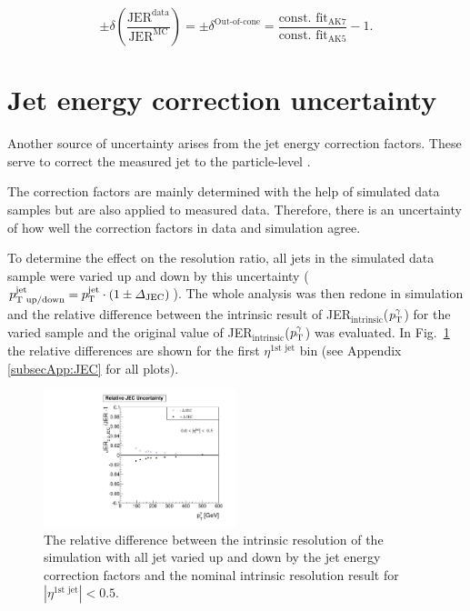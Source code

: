 \begin{equation}
\label{MCUncFINAL}
\pm \delta \left( \frac{\text{JER}^{\text{data}}}{\text{JER}^{\text{MC}}} \right) = \pm \delta^{\text{Out-of-cone}} = \frac{\text{const. fit}_{\text{AK7}}}{\text{const. fit}_{\text{AK5}}} - 1.
\end{equation}

\section*{Jet energy correction uncertainty}
Another source of uncertainty arises from the jet energy correction factors.
These serve to correct the measured jet \pt to the particle-level \pt.

The correction factors are mainly determined with the help of simulated data samples but are also applied to measured data. 
Therefore, there is an uncertainty of how well the correction factors in data and simulation agree.

To determine the effect on the resolution ratio, all jets in the simulated data sample were varied up and down by this uncertainty 
($p^{\text{jet}}_{\text{T up/down}} = p_{\text{T}}^{\text{jet}} \cdot (1 \pm \Delta_{\text{JEC}})$).
The whole analysis was then redone in simulation and the relative difference between the intrinsic result of JER$_{\text{intrinsic}}$($p_{\text{T}}^{\gamma}$) 
for the varied sample and the original value of JER$_{\text{intrinsic}}$($p_{\text{T}}^{\gamma}$)
was evaluated.
In \mbox{Fig. \ref{fig:JECUncertainty}} the relative differences are shown for the first $\eta^{\text{1st jet}}$ bin (see Appendix \ref{subsecApp:JEC} for all plots).


\begin{figure}[b]
  \centering
      \includegraphics[width=0.50\textwidth]{figures/resolution/systematicUncertainties/Relative_Resolution_for_1_eta_bin_JECUncertainty_RMS99.pdf}
   \caption{The relative difference between the intrinsic resolution of the simulation with all jet \pt varied up and down by the jet energy correction factors 
           and the nominal intrinsic resolution result for \mbox{$|\eta^{\text{1st jet}}| < 0.5$.}}  
  \label{fig:JECUncertainty}
\end{figure}

